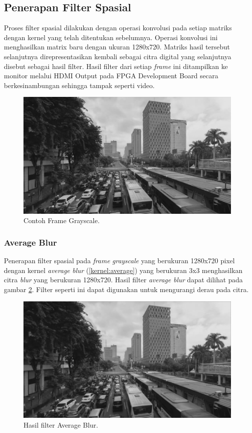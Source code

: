\subsection{Penerapan Filter Spasial}

Proses filter spasial dilakukan dengan operasi konvolusi pada setiap matriks dengan kernel yang telah ditentukan sebelumnya. Operasi konvolusi ini menghasilkan matrix baru dengan ukuran 1280x720. Matriks hasil tersebut selanjutnya direpresentasikan kembali sebagai citra digital yang selanjutnya disebut sebagai hasil filter. Hasil filter dari setiap \textit{frame} ini ditampilkan ke monitor melalui HDMI Output pada FPGA Development Board secara berkesinambungan sehingga tampak seperti video.

\begin{figure}[H]
    \includegraphics[width=0.8\linewidth, center]{images/output-image/input1-grayscale.png}
    \caption{Contoh Frame Grayscale.}
    \label{fig:input-grayscale}
\end{figure}

\subsubsection{Average Blur}
Penerapan filter spasial pada \textit{frame} \textit{grayscale} yang berukuran 1280x720 pixel dengan kernel \textit{average blur} (\ref{kernel:average}) yang berukuran 3x3 menghasilkan citra 
\textit{blur} yang berukuran 1280x720. Hasil filter \textit{average blur} dapat dilihat pada gambar \ref{fig:output-averageblur}. Filter seperti ini dapat digunakan untuk mengurangi derau pada citra.
\begin{figure}
    \includegraphics[width=0.8\linewidth, center]{images/output-image/input1-averageblur.png}
    \caption{Hasil filter Average Blur.}
    \label{fig:output-averageblur}
\end{figure}

